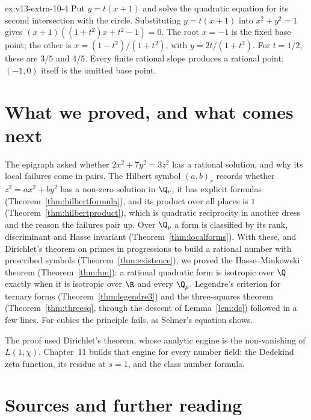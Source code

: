\begin{solution}{ex:v13-extra-10-4}
\idea Put $y=t(x+1)$ and solve the quadratic equation for its second intersection with the circle.
\writeup Substituting $y=t(x+1)$ into $x^2+y^2=1$ gives $(x+1)((1+t^2)x+t^2-1)=0$. The root $x=-1$ is the fixed base point; the other is $x=(1-t^2)/(1+t^2)$, with $y=2t/(1+t^2)$. For $t=1/2$, these are $3/5$ and $4/5$. Every finite rational slope produces a rational point; $(-1,0)$ itself is the omitted base point.
\end{solution}

\section{What we proved, and what comes next}

The epigraph asked whether $2x^2+7y^2=3z^2$ has a rational solution, and why its local failures come in pairs. The Hilbert
symbol $(a,b)_v$ records whether $z^2=ax^2+by^2$ has a non-zero solution in $\Q_v$; it has explicit formulas
(Theorem~\ref{thm:hilbertformula}), and its product over all places is $1$ (Theorem~\ref{thm:hilbertproduct}), which is quadratic
reciprocity in another dress and the reason the failures pair up. Over $\Q_p$ a form is classified by its rank, discriminant
and Hasse invariant (Theorem~\ref{thm:localforms}). With these, and Dirichlet's theorem on primes in progressions to build a
rational number with prescribed symbols (Theorem~\ref{thm:existence}), we proved the Hasse--Minkowski theorem
(Theorem~\ref{thm:hm}): a rational quadratic form is isotropic over $\Q$ exactly when it is isotropic over $\R$ and every
$\Q_p$. Legendre's criterion for ternary forms (Theorem~\ref{thm:legendre3}) and the three-squares theorem
(Theorem~\ref{thm:threesq}, through the descent of Lemma~\ref{lem:dc}) followed in a few lines. For cubics the principle fails,
as Selmer's equation shows.

The proof used Dirichlet's theorem, whose analytic engine is the non-vanishing of $L(1,\chi)$. Chapter~11 builds that engine
for every number field: the Dedekind zeta function, its residue at $s=1$, and the class number formula.

\section*{Sources and further reading}

